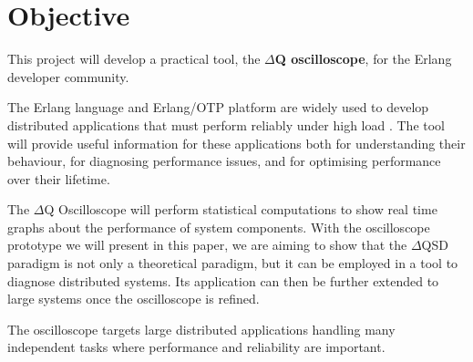 \section{Objective}
         This project will develop a practical tool, the \textbf{$\Delta$Q oscilloscope}, for the Erlang developer community. 
    
    The Erlang language and Erlang/OTP platform are widely used to develop distributed applications that must perform reliably under high load \cite{erl}. The tool will provide useful information for these applications both for understanding their behaviour, for diagnosing performance issues, and for optimising performance over their lifetime. \cite{post}

    The $\Delta$Q Oscilloscope will perform statistical computations to show real time graphs about the performance of system components. With the oscilloscope prototype we will present in this paper, we are aiming to show that the $\Delta$QSD paradigm is not only a theoretical paradigm, but it can be employed in a tool to diagnose distributed systems. Its application can then be further extended to large systems once the oscilloscope is refined.  
 
    The oscilloscope targets large distributed applications handling many independent tasks where performance and reliability are important. \cite{dq-tut}
    

